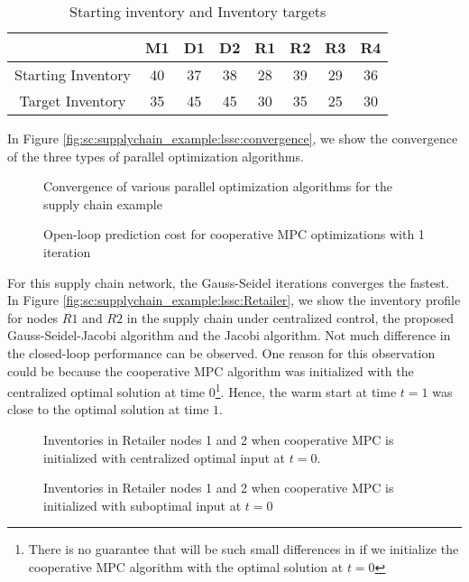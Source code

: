 \begin{table}[h]
\caption{Starting inventory and Inventory targets}
\begin{center}
\begin{tabular}{cccccccc}\toprule
& M1&D1&D2&R1&R2&R3&R4 \\
\midrule
Starting Inventory&40&37&38&28&39&29&36\\
Target Inventory&35&45&45&30&35&25&30\\
\bottomrule
\end{tabular}
\end{center}
\label{tab:sc:supplychain_example:lssc}
\end{table}


In Figure \ref{fig:sc:supplychain_example:lssc:convergence}, we show
the convergence of the three types of parallel optimization
algorithms. 

\begin{figure}
\centering
\scriptsize
\resizebox{\textwidth}{!}{}
\caption{Convergence of various parallel optimization algorithms for
  the supply chain example}
\label{fig:sc:supplychain_example:lssc:convergence}
\centering
\scriptsize
\resizebox{\textwidth}{!}{}
\caption{Open-loop prediction cost for cooperative MPC optimizations
  with 1 iteration}
\label{fig:sc:supplychain_example:lssc:VN}
\end{figure}

For this supply chain network, the Gauss-Seidel iterations converges
the fastest. In Figure
\ref{fig:sc:supplychain_example:lssc:Retailer}, we show the
inventory profile for  nodes $R1$ and $R2$  in the supply chain under centralized
control, the proposed Gauss-Seidel-Jacobi  algorithm
and the Jacobi algorithm. Not much difference in the
closed-loop performance can be observed. One reason for this
observation could be because the cooperative MPC
algorithm was initialized with the centralized optimal solution at
time $0$\footnote{There is no guarantee that will be such small differences in
if we initialize the cooperative MPC algorithm with the optimal
solution at $t=0$}. Hence, the warm start at time $t=1$ was close to the optimal
solution at time $1$.
\begin{figure}
\centering
\scriptsize
\resizebox{\textwidth}{!}{}
\caption{Inventories in Retailer nodes 1 and 2 when cooperative MPC is
  initialized with centralized optimal input at $t=0$.}
\label{fig:sc:supplychain_example:lssc:Retailer}

\centering
\scriptsize
\resizebox{\textwidth}{!}{}
\caption{Inventories in Retailer nodes 1 and 2 when cooperative MPC is
initialized with suboptimal input at $t=0$}
\label{fig:sc:supplychain_example:lssc:bad}
\end{figure}

